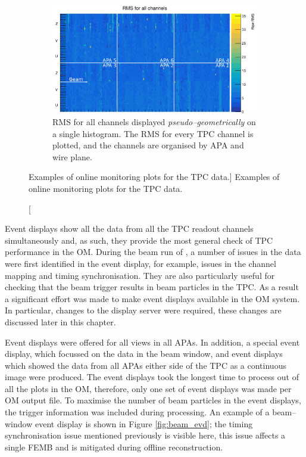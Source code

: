 \begin{figure}
	\begin{subfigure}[b]{0.73\textwidth}
		\centering
		\vspace{3mm}
		\includegraphics[width=\textwidth]{figures/all_chan_rms.png}
		\caption {RMS for all channels displayed \emph{pseudo--geometrically} on a 
		single histogram. The RMS for every TPC channel is plotted, and the channels 
		are organised by APA and wire plane.} 
		\label{fig:ped_noise}
	\end{subfigure}

	\caption
	[Examples of online monitoring plots for the TPC data.]
	{Examples of online monitoring plots for the TPC data.}
	\label{fig:tpc_om}

\end{figure}

Event displays show all the data from all the TPC readout channels
simultaneously and, as such, they provide the most general check of TPC 
performance in the OM. During the beam run of \protodune{}, a number of issues 
in the data were first identified in the event display, for example, issues in 
the channel mapping and timing synchronisation. They are also particularly 
useful for checking that the beam trigger results in beam particles in the 
TPC. As a result a significant effort was made to make event displays 
available in the \protodune{} OM system. In particular, changes to the display 
server were required, these changes are discussed later in this chapter. 

Event displays were offered for all views in all APAs. In addition, a special 
event display, which focussed on the data in the beam window, and event 
displays which showed the data from all APAs either side of the TPC as a 
continuous image were produced. The event displays took the longest time to 
process out of all the plots in the OM, therefore, only one set of event 
displays was made per OM output file. To maximise the number of beam particles 
in the event displays, the trigger information was included during 
processing. An example of a beam--window event display is shown in Figure 
\ref{fig:beam_evd}; the timing synchronisation issue mentioned previously is 
visible here, this issue affects a single FEMB and is mitigated during offline 
reconstruction.

